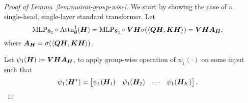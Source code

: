 \begin{proof}[Proof of Lemma~\ref{lem:moirai-group-wise}]\label{proof:group-wise}
    We start by showing the case of a single-head, single-layer standard transformer.
    Let 
    \[
    \text{MLP}_{\bm{\theta}_2} \circ \text{Attn}_{\bm{\theta}}^\dagger
    (\bm{H})
    =
    \text{MLP}_{\bm{\theta}_2}
    \circ
    \bm{V} \bm{H}
    \sigma
    (
    \Braket{
    \bm{Q} \bm{H}, 
    \bm{K} \bm{H}
    }
    )
    =
    \bm{V} \bm{H}
    \bm{A}_{\bm{H}},
    \]
    where $\bm{A}_{\bm{H}} = \sigma(\Braket{
    \bm{Q} \bm{H}, 
    \bm{K} \bm{H}})$.

    Let $\psi_1(\bm{H}) \coloneqq \bm{V} \bm{H} \bm{A}_{\bm{H}}$, to apply group-wise operation of $\psi_1(\cdot)$ on some input such that
    \[
    \psi_1(
    \bm{H}^\star
    )
    =
    \begin{bmatrix}
        \psi_1(\bm{H}_1) & \psi_1(\bm{H}_2) & \cdots & \psi_1(\bm{H}_K)
    \end{bmatrix}.
    \]


\end{proof}
